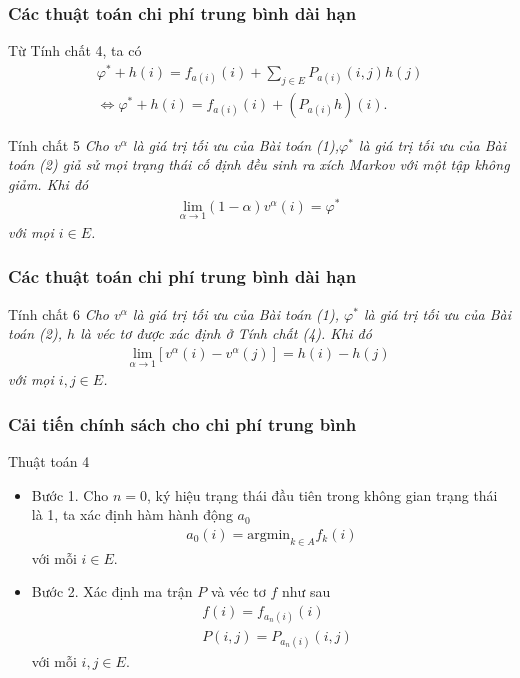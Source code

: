 \documentclass[12pt]{beamer}
\begin{document}
\begin{frame}
	\frametitle{Các thuật toán chi phí trung bình dài hạn}
	Từ Tính chất 4, ta có
	\begin{align}
	\varphi^*+h(i)=f_{a(i)}(i)+\sum_{j \in E}P_{a(i)}(i,j)h(j)\\
	\Leftrightarrow \varphi^*+h(i)=f_{a(i)}(i)+(P_{a(i)}h)(i).
	\end{align}
	\begin{alertblock}{Tính chất 5}
		\textit{Cho $v^\alpha$ là giá trị tối ưu của Bài toán (1),$\varphi^*$ là giá trị tối ưu của Bài toán (2)  giả sử mọi trạng thái cố định đều sinh ra xích Markov với một tập không giảm. Khi đó
			\begin{align*}
			\underset{\alpha \rightarrow 1}{\mathrm{lim}}(1-\alpha)v^\alpha(i)=\varphi^*
			\end{align*}
			với mọi $i \in E$.
		} 
	\end{alertblock}
\end{frame}

\begin{frame}
	\frametitle{Các thuật toán chi phí trung bình dài hạn}
	
	\begin{alertblock}{Tính chất 6}
		\textit{Cho $v^\alpha$ là giá trị tối ưu của Bài toán (1), $\varphi^*$ là giá trị tối ưu của Bài toán (2), $h$ là véc tơ được xác định ở Tính chất (4). Khi đó
			\begin{align*}
			\underset{\alpha \rightarrow 1}{\mathrm{lim}}[v^\alpha (i)-v^\alpha (j)]=h(i)-h(j)
			\end{align*}
			với mọi $i,j \in E$.
		}  
	\end{alertblock}
\end{frame}


\begin{frame}
	\frametitle{ Cải tiến chính sách cho chi phí trung bình}
	\begin{block}{Thuật toán 4}
\begin{itemize}
	\item
		Bước 1. Cho $n=0$, ký hiệu trạng thái đầu tiên trong không gian trạng thái là 1, ta xác định hàm hành động $a_0$
	\begin{align*}
	a_0(i)=\mathrm{argmin}_{k \in A}f_k(i)
	\end{align*}
	với mỗi $i \in E$.
	
	\item
	Bước 2. Xác định ma trận $P$ và véc tơ $f$ như sau
	\begin{align*}
	&f(i)=f_{a_n(i)}(i)\\
	&P(i,j)=P_{a_n(i)}(i,j)
	\end{align*}
	với mỗi $i,j \in E$.
	\end{itemize}
\end{block}
\end{frame}
\end{document}
